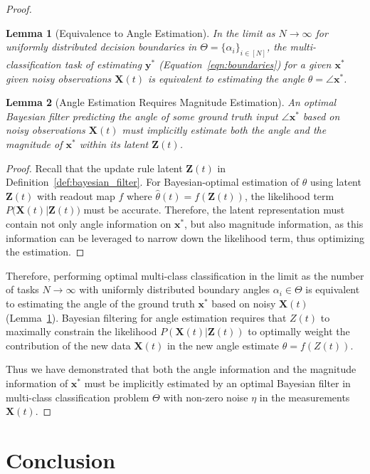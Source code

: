 \documentclass[12pt]{article}
\newtheorem{lemma}{Lemma}
\begin{document}
\begin{proof}
	\begin{lemma}[Equivalence to Angle Estimation] 
		\label{lemma:angle_equiv}
		In the limit as $N\to\infty$ for uniformly distributed decision
		boundaries in $\Theta = \{\alpha_i\}_{i\in[N]}$, the
		multi-classification task of estimating $\mathbf y^*$
		(Equation~\ref{eqn:boundaries}) for a given $\mathbf x^*$ given noisy
		observations $\mathbf X(t)$ is equivalent to estimating the angle
		$\theta = \angle \mathbf x^*$. 
	\end{lemma}


	\begin{lemma}[Angle Estimation Requires Magnitude Estimation]
		\label{lemma:angle_to_magnitude}
		An optimal Bayesian filter predicting the angle of some ground 
		truth input $\angle \mathbf x^*$ based on noisy observations 
		$\mathbf X(t)$ must implicitly estimate both the angle and the 
		magnitude of $\mathbf x^*$ within its latent $\mathbf Z(t)$. 
	\end{lemma}
	\begin{proof}
		Recall that the update rule latent $\mathbf Z(t)$ in
		Definition~\ref{def:bayesian_filter}. 
		For Bayesian-optimal estimation of $\theta$ using latent $\mathbf Z(t)$
		with readout map $f$ where $\hat\theta(t) = f(\mathbf Z(t))$, the
		likelihood term $P\big(\mathbf X(t) | \mathbf Z(t)\big)$ must be
		accurate.
		Therefore, the latent representation must contain not only angle 
		information on $\mathbf x^*$, but also magnitude information, as 
		this information can be leveraged to narrow down the likelihood term, 
		thus optimizing the estimation.
	\end{proof}

	Therefore, performing optimal multi-class classification in the limit as the 
	number of tasks $N\to\infty$ with uniformly distributed boundary angles 
	$\alpha_i\in \Theta$ is equivalent to estimating the angle of the ground truth 
	$\mathbf x^*$ based on noisy $\mathbf X(t)$ (Lemma~\ref{lemma:angle_equiv}). 
	Bayesian filtering for angle estimation requires that $Z(t)$ to maximally 
	constrain the likelihood $P(\mathbf X(t) | \mathbf Z(t))$ to optimally 
	weight the contribution of the new data $\mathbf X(t)$ in the new angle 
	estimate $\hat\theta = f(Z(t))$. 

	Thus we have demonstrated that both the angle information and the magnitude 
	information of $\mathbf x^*$ must be implicitly estimated by an optimal 
	Bayesian filter in multi-class classification problem $\Theta$ with non-zero
	noise $\eta$ in the measurements $\mathbf X(t)$. 
\end{proof}


\section{Conclusion}
\end{document}
